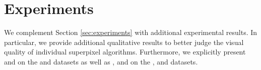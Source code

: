 \section{Experiments}
\label{sec:appendix-experiments}

We complement Section \ref{sec:experiments} with additional experimental results.
In particular, we provide additional qualitative results to better judge the visual
quality of individual superpixel algorithms. Furthermore, we explicitly present \ASA and \UEL
on the \BSDS and \NYU datasets as well as \Rec, \UE and \EV on the \SBD, \SUNRGBD and \Fash datasets.




